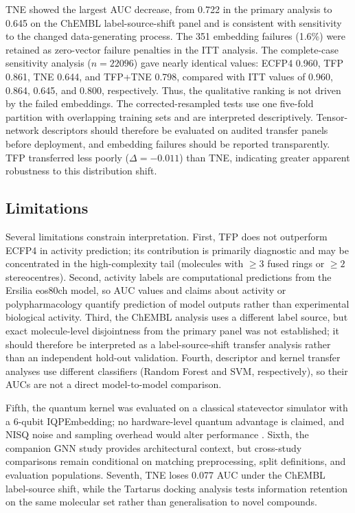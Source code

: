\documentclass[11pt,a4paper]{article}
\begin{document}
TNE showed the largest AUC decrease, from \num{0.722} in the primary analysis to \num{0.645} on the ChEMBL label-source-shift panel and is consistent with sensitivity to the changed data-generating process. The \num{351} embedding failures (\num{1.6}\%) were retained as zero-vector failure penalties in the ITT analysis. The complete-case sensitivity analysis ($n = \num{22096}$) gave nearly identical values: ECFP4 \num{0.960}, TFP \num{0.861}, TNE \num{0.644}, and TFP+TNE \num{0.798}, compared with ITT values of \num{0.960}, \num{0.864}, \num{0.645}, and \num{0.800}, respectively. Thus, the qualitative ranking is not driven by the failed embeddings. The corrected-resampled tests use one five-fold partition with overlapping training sets and are interpreted descriptively. Tensor-network descriptors should therefore be evaluated on audited transfer panels before deployment, and embedding failures should be reported transparently. TFP transferred less poorly ($\Delta = -\num{0.011}$) than TNE, indicating greater apparent robustness to this distribution shift.

\subsection{Limitations}

Several limitations constrain interpretation. First, TFP does not outperform ECFP4 in activity prediction; its contribution is primarily diagnostic and may be concentrated in the high-complexity tail (molecules with $\geq 3$ fused rings or $\geq 2$ stereocentres). Second, activity labels are computational predictions from the Ersilia eos80ch model, so AUC values and claims about activity or polypharmacology quantify prediction of model outputs rather than experimental biological activity. Third, the ChEMBL analysis uses a different label source, but exact molecule-level disjointness from the primary panel was not established; it should therefore be interpreted as a label-source-shift transfer analysis rather than an independent hold-out validation. Fourth, descriptor and kernel transfer analyses use different classifiers (Random Forest and SVM, respectively), so their AUCs are not a direct model-to-model comparison.

Fifth, the quantum kernel was evaluated on a classical statevector simulator with a 6-qubit IQPEmbedding; no hardware-level quantum advantage is claimed, and NISQ noise and sampling overhead would alter performance \citep{preskill2018nisq}. Sixth, the companion GNN study \citep{temgoua2027gnn} provides architectural context, but cross-study comparisons remain conditional on matching preprocessing, split definitions, and evaluation populations. Seventh, TNE loses \num{0.077} AUC under the ChEMBL label-source shift, while the Tartarus docking analysis tests information retention on the same molecular set rather than generalisation to novel compounds.
\end{document}
